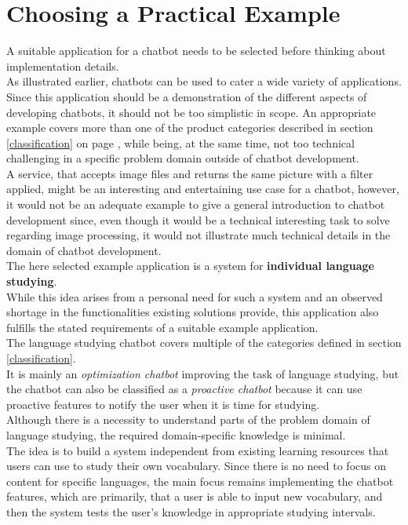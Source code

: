 \section{Choosing a Practical Example}


A suitable application for a chatbot needs to be selected before thinking about implementation details.
\\

As illustrated earlier, chatbots can be used to cater a wide variety of applications.
Since this application should be a demonstration of the different aspects of developing chatbots,
it should not be too simplistic in scope.
An appropriate example covers more than one of the product categories described in section \ref{classification} on page \pageref{classification},
while being, at the same time, not too technical challenging in a specific  problem domain outside of chatbot development.
\\
A service, that accepts image files and returns the same picture with a filter applied,
might be an interesting and entertaining use case for a chatbot,
however, it would not be an adequate example to give a general introduction to chatbot development since,
even though it would be a technical interesting task to solve regarding image processing,
it would not illustrate much technical details in the domain of chatbot development.
\\

The here selected example application is a system for \textbf{individual language studying}.
\\
While this idea arises from a personal need for such a system and an observed shortage in the functionalities existing solutions provide,
this application also fulfills the stated requirements of a suitable example application.
\\
The language studying chatbot covers multiple of the categories defined in section \ref{classification}.
\\
It is mainly an \emph{optimization chatbot} improving the task of language studying,
but the chatbot can also be classified as a \emph{proactive chatbot} because it can use proactive features to notify the user when it is time for studying.
\\
Although there is a necessity to understand parts of the problem domain of language studying,
the required domain-specific knowledge is minimal.
\\
The idea is to build a system independent from existing learning resources that users can use to study their own vocabulary.
Since there is no need to focus on content for specific languages, the main focus remains implementing the chatbot features,
which are primarily, that a user is able to input new vocabulary, and then the system tests the user's knowledge in appropriate studying intervals.
